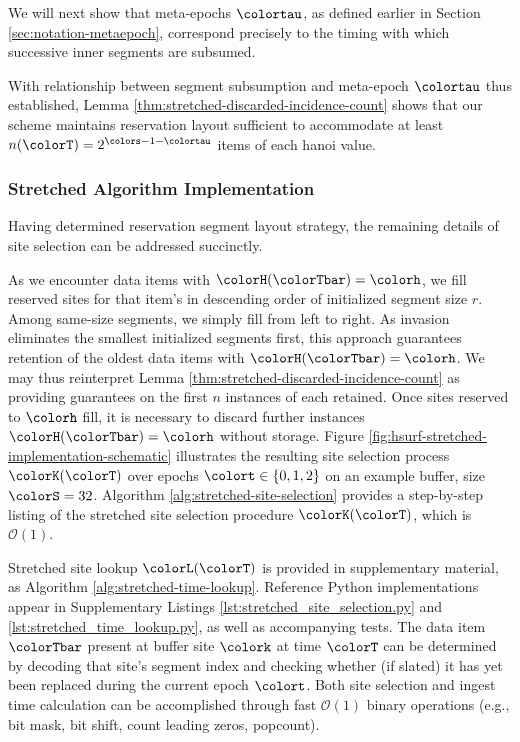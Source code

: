 We will next show that meta-epochs $\colortau$, as defined earlier in Section \ref{sec:notation-metaepoch}, correspond precisely to the timing with which successive inner segments are subsumed.



With relationship between segment subsumption and meta-epoch $\colortau$ thus established, Lemma \ref{thm:stretched-discarded-incidence-count} shows that our scheme maintains reservation layout sufficient to accommodate at least $n(\colorT) = 2^{\colors - 1 - \colortau}$ items of each hanoi value.

\subsubsection{Stretched Algorithm Implementation}
\label{sec:stretched-implementation}

Having determined reservation segment layout strategy, the remaining details of site selection can be addressed succinctly.

As we encounter data items with $\colorH(\colorTbar) = \colorh$, we fill reserved sites for that item's \hv{} in descending order of initialized segment size $r$.
Among same-size segments, we simply fill from left to right.
As invasion eliminates the smallest initialized segments first, this approach guarantees retention of the oldest data items with $\colorH(\colorTbar) = \colorh$.
We may thus reinterpret Lemma \ref{thm:stretched-discarded-incidence-count} as providing guarantees on the first $n$ instances of each \hv{} retained.
Once sites reserved to \hv{} $\colorh$ fill, it is necessary to discard further instances $\colorH(\colorTbar) = \colorh$ without storage.
Figure \ref{fig:hsurf-stretched-implementation-schematic} illustrates the resulting site selection process $\colorK(\colorT)$ over epochs $\colort \in \{0,1,2\}$ on an example buffer, size $\colorS=32$.
Algorithm \ref{alg:stretched-site-selection} provides a step-by-step listing of the stretched site selection procedure $\colorK(\colorT)$, which is $\mathcal{O}(1)$.



Stretched site lookup $\colorL(\colorT)$ is provided in supplementary material, as Algorithm \ref{alg:stretched-time-lookup}.
Reference Python implementations appear in Supplementary Listings \ref{lst:stretched_site_selection.py} and \ref{lst:stretched_time_lookup.py}, as well as accompanying tests.
The data item $\colorTbar$ present at buffer site $\colork$ at time $\colorT$ can be determined by decoding that site's segment index and checking whether (if slated) it has yet been replaced during the current epoch $\colort$.
Both site selection and ingest time calculation can be accomplished through fast $\mathcal{O}(1)$ binary operations (e.g., bit mask, bit shift, count leading zeros, popcount).

